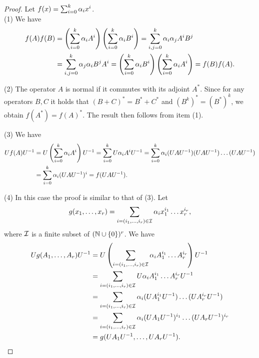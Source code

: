 \begin{proof}
Let $f(x)=\sum_{i=0}^k\alpha_ix^i$.\\[2mm]
(1) We have
\begin{align*}
f(A)f(B) &=\left(\sum_{i=0}^k\alpha_iA^i\right)\left(\sum_{i=0}^k\alpha_iB^i\right)=\sum_{i,j=0}^k\alpha_i\alpha_jA^iB^j\\
&=\sum_{i,j=0}^k\alpha_j\alpha_iB^jA^i=\left(\sum_{i=0}^k\alpha_iB^i\right)\left(\sum_{i=0}^k\alpha_iA^i\right)=f(B)f(A).
\end{align*}

\noindent
(2) The operator $A$ is normal if it commutes with its 
adjoint $A^*$. Since for any operators $B,C$ it holds that $(B+C)^*=B^*+C^*$ and $(B^k)^*=(B^*)^k$, we obtain $f(A^*)=f(A)^*$. The result then follows from item (1).

\noindent
(3) We have
\begin{align*}
Uf(A)U^{-1} &=U\left(\sum_{i=0}^k\alpha_iA^i\right)U^{-1} =\sum_{i=0}^kU\alpha_iA^iU^{-1} =\sum_{i=0}^k\alpha_i(UAU^{-1})(UAU^{-1})\dots(UAU^{-1})\\ 
&=\sum_{i=0}^k\alpha_i(UAU^{-1})^i=f(UAU^{-1}).
\end{align*}

\noindent
(4) In this case the proof is similar to that of (3). Let
\[
g(x_1,\dots,x_r)=\sum_{i=(i_1,\dots,i_r)\in\cal I}\alpha_ix_1^{i_1}\dots x_r^{i_r},
\]
where ${\mathcal I}$ is a finite subset of $({\mathbb N}\cup\{0\})^r$. We have
\begin{align*}
Ug(A_1,\dots,A_r)U^{-1} &=U\left(\sum_{i=(i_1,\dots,i_r)\in\cal I}\alpha_iA_1^{i_1}\dots A_r^{i_r}\right)U^{-1}\\
&=\sum_{i=(i_1,\dots,i_r)\in\cal I}U\alpha_iA_1^{i_1}\dots A_r^{i_r}U^{-1}\\ 
&=\sum_{i=(i_1,\dots,i_r)\in\cal I}\alpha_i(UA_1^{i_1}U^{-1})\dots(UA_r^{i_r}U^{-1})\\ 
&=\sum_{i=(i_1,\dots,i_r)\in\cal I}\alpha_i(UA_1U^{-1})^{i_1}\dots(UA_rU^{-1})^{i_r}\\
&=g(UA_1U^{-1},\dots,UA_rU^{-1}).
\end{align*}
\end{proof}




